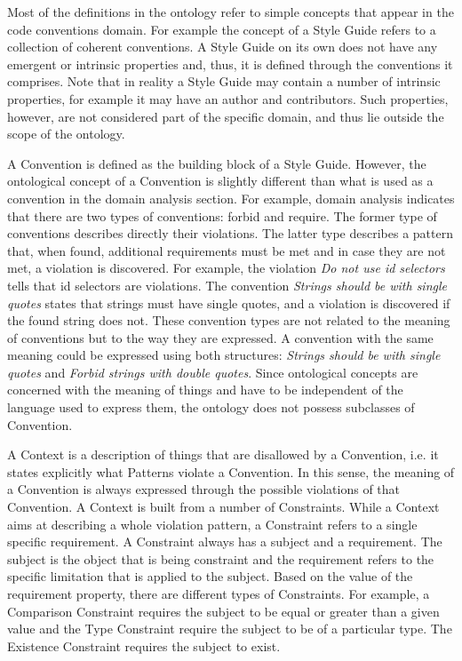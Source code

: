 Most of the definitions in the ontology refer to simple concepts that appear in the code conventions
domain. For example the concept of a Style Guide refers to a collection of coherent conventions. A
Style Guide on its own does not have any emergent or intrinsic properties and, thus, it is defined
through the conventions it comprises. Note that in reality a Style Guide may contain a number of
intrinsic properties, for example it may have an author and contributors. Such
properties, however, are not considered part of the specific domain, and thus lie outside the scope
of the ontology.

A Convention is defined as the building block of a Style Guide. However, the ontological concept of
a Convention is slightly different than what is used as a convention in the domain analysis section.
For example, domain analysis indicates that there are two types of conventions: forbid and require.
The former type of conventions describes directly their violations. The latter type describes a
pattern that, when found, additional requirements must be met and in case they are not met, a
violation is discovered. For example, the violation \textit{Do not use id selectors} tells that id
selectors are violations. The convention \textit{Strings should be with single quotes} states that
strings must have single quotes, and a violation is discovered if the found string does not.
These convention types are not related to the meaning of conventions but to the way they are expressed. A
convention with the same meaning could be expressed using both structures: \textit{Strings should be
with single quotes} and \textit{Forbid strings with double quotes}. Since ontological concepts are
concerned with the meaning of things and have to be independent of the language used to express
them, the ontology does not possess subclasses of Convention.

A Context is a description of things that are disallowed by a Convention, i.e. it states explicitly
what Patterns violate a Convention. In this sense, the meaning of a Convention is always expressed
through the possible violations of that Convention. A Context is built from a number of Constraints.
While a Context aims at describing a whole violation pattern, a Constraint refers to a single
specific requirement. A Constraint always has a subject and a requirement. The subject is the object
that is being constraint and the requirement refers to the specific limitation that is applied to
the subject. Based on the value of the requirement property, there are different types of
Constraints. For example, a Comparison Constraint requires the subject to be equal or greater than a
given value and the Type Constraint require the subject to be of a particular type. The Existence
Constraint requires the subject to exist.

